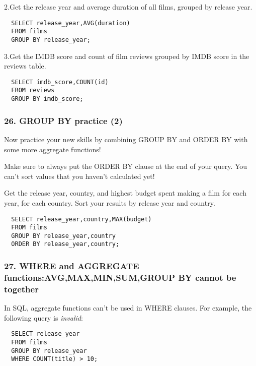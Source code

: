 \documentclass[
]{article}
\begin{document}
2.Get the release year and average duration of all films, grouped by
release year.

\begin{verbatim}
  SELECT release_year,AVG(duration)
  FROM films
  GROUP BY release_year;
\end{verbatim}

3.Get the IMDB score and count of film reviews grouped by IMDB score in
the reviews table.

\begin{verbatim}
  SELECT imdb_score,COUNT(id)
  FROM reviews
  GROUP BY imdb_score;
\end{verbatim}

\hypertarget{group-by-practice-2}{%
\subsubsection{26. GROUP BY practice (2)}\label{group-by-practice-2}}

Now practice your new skills by combining GROUP BY and ORDER BY with
some more aggregate functions!

Make sure to always put the ORDER BY clause at the end of your query.
You can't sort values that you haven't calculated yet!

Get the release year, country, and highest budget spent making a film
for each year, for each country. Sort your results by release year and
country.

\begin{verbatim}
  SELECT release_year,country,MAX(budget)
  FROM films
  GROUP BY release_year,country
  ORDER BY release_year,country;
\end{verbatim}

\hypertarget{where-and-aggregate-functionsavgmaxminsumgroup-by-cannot-be-together}{%
\subsubsection{27. WHERE and AGGREGATE functions:AVG,MAX,MIN,SUM,GROUP
BY cannot be
together}\label{where-and-aggregate-functionsavgmaxminsumgroup-by-cannot-be-together}}

In SQL, aggregate functions can't be used in WHERE clauses. For example,
the following query is \emph{invalid}:

\begin{verbatim}
  SELECT release_year
  FROM films
  GROUP BY release_year
  WHERE COUNT(title) > 10;
\end{verbatim}
\end{document}
